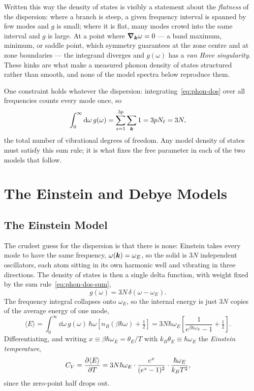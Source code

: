 Written this way the density of states is visibly a statement about the \emph{flatness} of the dispersion: where a branch is steep, a given frequency interval is spanned by few modes and $g$ is small; where it is flat, many modes crowd into the same interval and $g$ is large. At a point where $\grad_{\bm{k}}\omega = 0$ --- a band maximum, minimum, or saddle point, which symmetry guarantees at the zone centre and at zone boundaries --- the integrand diverges and $g(\omega)$ has a \emph{van Hove singularity}. These kinks are what make a measured phonon density of states structured rather than smooth, and none of the model spectra below reproduce them.

One constraint holds whatever the dispersion: integrating~\eqref{eq:phon-dos} over all frequencies counts every mode once, so
\begin{equation}
    \int_0^\infty \dd\omega\, g(\omega) = \sum_{s=1}^{3p}\sum_{\bm{k}} 1 = 3pN_\ell = 3N,
    \label{eq:phon-dos-sum}
\end{equation}
the total number of vibrational degrees of freedom. Any model density of states must satisfy this sum rule; it is what fixes the free parameter in each of the two models that follow.

\section{The Einstein and Debye Models}

\subsection{The Einstein Model}

The crudest guess for the dispersion is that there is none: Einstein takes every mode to have the same frequency, $\omega(\bm{k}) = \omega_E$, so the solid is $3N$ independent oscillators, each atom sitting in its own harmonic well and vibrating in three directions. The density of states is then a single delta function, with weight fixed by the sum rule~\eqref{eq:phon-dos-sum},
\begin{equation}
    g(\omega) = 3N\,\delta(\omega - \omega_E).
\end{equation}
The frequency integral collapses onto $\omega_E$, so the internal energy is just $3N$ copies of the average energy of one mode,
\begin{equation}
    \langle E\rangle = \int_0^\infty \dd\omega\, g(\omega)\,\hbar\omega\left[n_B(\beta\hbar\omega) + \tfrac{1}{2}\right]
    = 3N\hbar\omega_E\left[\frac{1}{e^{\beta\hbar\omega_E} - 1} + \tfrac{1}{2}\right].
\end{equation}
Differentiating, and writing $x \equiv \beta\hbar\omega_E = \theta_E/T$ with $k_B\theta_E \equiv \hbar\omega_E$ the \emph{Einstein temperature},
\begin{equation}
    C_V = \pdv{\langle E\rangle}{T} = 3N\hbar\omega_E \cdot \frac{e^{x}}{(e^{x}-1)^2}\cdot\frac{\hbar\omega_E}{k_B T^2},
\end{equation}
since the zero-point half drops out.


